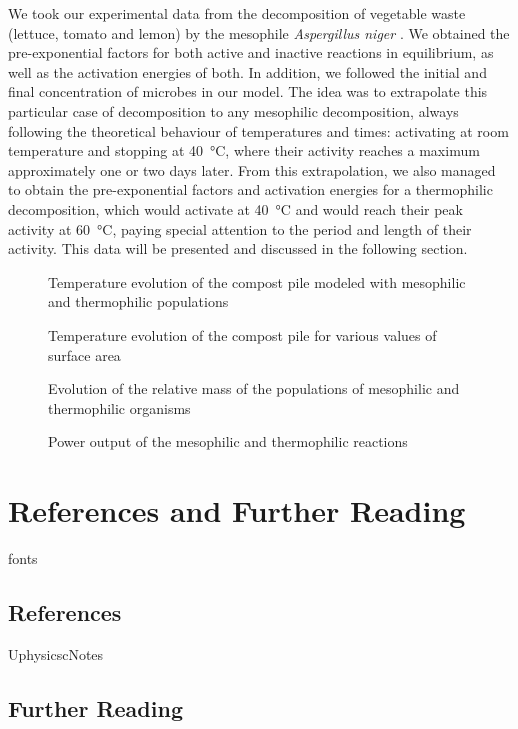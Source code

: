 \documentclass[12pt, a4paper, twocolumn]{article}
\numberwithin{table}{section}
\numberwithin{figure}{section}
\numberwithin{equation}{section}
\begin{document}
We took our experimental data from the decomposition of vegetable waste (lettuce, tomato and lemon) by the mesophile \textit{Aspergillus niger} \cite{saucedo}. We obtained the pre-exponential factors for both active and inactive reactions in equilibrium, as well as the activation energies of both. In addition, we followed the initial and final concentration of microbes in our model. 
The idea was to extrapolate this particular case of decomposition to any mesophilic decomposition, always following the theoretical behaviour of temperatures and times: activating at room temperature and stopping at \SI{40}{\celsius}, where their activity reaches a maximum approximately one or two days later. From this extrapolation, we also managed to obtain the pre-exponential factors and activation energies for a thermophilic decomposition, which would activate at \SI{40}{\celsius} and would reach their peak activity at \SI{60}{\celsius}, paying special attention to the period and length of their activity. This data will be presented and discussed in the following section. 

\begin{figure}[htb]
	\sffamily \footnotesize \centering
	\caption{Temperature evolution of the compost pile modeled with mesophilic and thermophilic populations}
	\label{fig:temp-mesos-termos}
\end{figure}

\begin{figure}[htb]
	\sffamily \footnotesize \centering
	\caption{Temperature evolution of the compost pile for various values of surface area}
	\label{fig:temp-arees}
\end{figure}

\begin{figure}[htb]
	\sffamily \footnotesize \centering
	\caption{Evolution of the relative mass of the populations of mesophilic and thermophilic organisms}
	\label{fig:poblacions}
\end{figure}

\begin{figure}[htb]
	\sffamily \footnotesize \centering
	\caption{Power output of the mesophilic and thermophilic reactions}
	\label{fig:potencies}
\end{figure}

\clearpage
\appendix
\section{References and Further Reading}
\begin{btSect}{fonts}
	
	\subsection*{References}	
	\btPrintCited
\end{btSect}

\begin{btSect}{UphysicscNotes}
	
	\subsection*{Further Reading}	
	\btPrintNotCited
\end{btSect}
\end{document}
